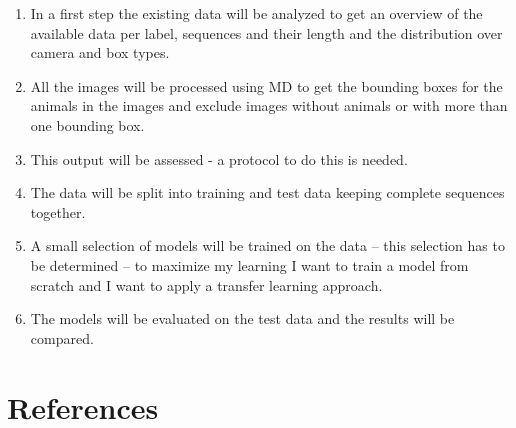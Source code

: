 \documentclass{article}
\begin{document}
\begin{enumerate}
  \item In a first step the existing data will be analyzed to get an overview of the available data per label, sequences and their length and the distribution over camera and box types.
  \item All the images will be processed using MD to get the bounding boxes for the animals in the images and exclude images without animals or with more than one bounding box.
  \item This output will be assessed - a protocol to do this is needed.
  \item The data will be split into training and test data keeping complete sequences together.
  \item A small selection of models will be trained on the data -- this selection has to be determined -- to maximize my learning I want to train a model from scratch and I
  want to apply a transfer learning approach.
  \item The models will be evaluated on the test data and the results will be compared.
\end{enumerate}

\section*{References}

\printbibliography[heading=none]
\end{document}

